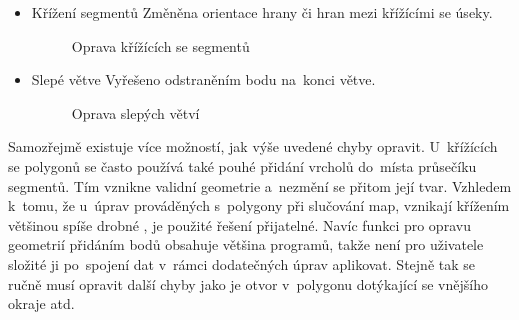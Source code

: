 \begin{itemize}
 \item Křížení segmentů
	\subitem Změněna orientace hrany či hran mezi křížícími se úseky.

\vspace{0.2cm}
  \begin{figure}[H]
    \centering
      \def\svgwidth{360pt}
      
      \caption{Oprava křížících se segmentů}
      \label{fig:crossing}
  \end{figure}

 \item Slepé větve
	\subitem Vyřešeno odstraněním bodu na~konci větve.
\vspace{0.2cm}
  \begin{figure}[H]
    \centering
      \def\svgwidth{360pt}
      
      \caption{Oprava slepých větví}
      \label{fig:dead-branch}
  \end{figure}

\end{itemize}

Samozřejmě existuje více možností, jak výše uvedené chyby opravit.
U~křížících se polygonů se často používá také pouhé přidání vrcholů
do~místa průsečíku segmentů. Tím vznikne validní geometrie a~nezmění
se přitom její tvar. Vzhledem k~tomu, že u~úprav prováděných 
s~polygony při slučování map, vznikají křížením většinou spíše drobné
, je použité řešení přijatelné. Navíc funkci pro opravu
geometrií přidáním bodů obsahuje většina  programů, takže není
pro uživatele složité ji po~spojení dat v~rámci dodatečných úprav
aplikovat. Stejně tak se ručně musí opravit další chyby jako je 
otvor v~polygonu dotýkající se vnějšího okraje atd.
